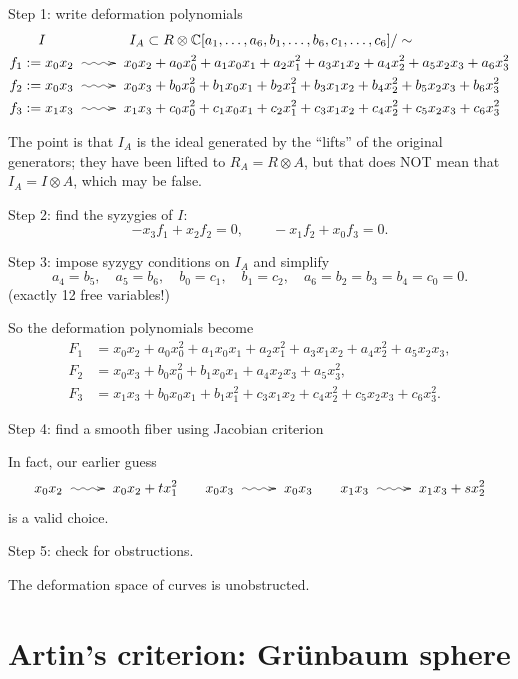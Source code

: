Step 1: write deformation polynomials
$$
\begin{aligned}
I\qquad &\qquad \qquad I_A \subset R \otimes \mathbb{C}[a_1,\ldots, a_6,b_1,\ldots,b_6,c_1,\ldots,c_6]/\sim
\\
\hspace{-0.5em}f_1:=x_0x_2&\xymatrix{\ar@{~>}[r]&}
x_0x_2+a_0x_0^2+a_1x_0x_1+a_2x_1^2+a_3x_1x_2+a_4x_2^2+a_5x_2x_3+a_6x_3^2\\
f_2:=x_0x_3&\xymatrix{\ar@{~>}[r]&}
x_0x_3+b_0x_0^2+b_1x_0x_1+b_2x_1^2+b_3x_1x_2+b_4x_2^2+b_5x_2x_3+b_6x_3^2\\
f_3:=x_1x_3&\xymatrix{\ar@{~>}[r]&}
x_1x_3+c_0x_0^2+c_1x_0x_1+c_2x_1^2+c_3x_1x_2+c_4x_2^2+c_5x_2x_3+c_6x_3^2
\end{aligned}
$$

\noindent
The point is that $I_A$ is the ideal
generated by the ``lifts'' of the
original generators; they have been
lifted to $R_A = R \otimes A$,
but that does NOT mean that
$I_A = I \otimes A$, which may be false.

\noindent
Step 2: find the syzygies of $I$:
$$
-x_3 f_1+x_2f_2=0,\qquad
-x_1f_2+x_0f_3=0.
$$

\medskip\noindent
Step 3: impose syzygy conditions on $I_A$
and simplify
$$
a_4=b_5,\quad  a_5=b_6,
\quad b_0=c_1, \quad  b_1=c_2,
\quad a_6=b_2=b_3=b_4=c_0=0.
$$
(exactly 12 free variables!)

So the deformation polynomials become
$$
\begin{aligned}
F_1&=x_0x_2+a_0x_0^2+a_1x_0x_1+a_2x_1^2+a_3x_1x_2+a_4x_2^2+a_5x_2x_3,\\
F_2&=x_0x_3+b_0x_0^2+b_1x_0x_1+a_4x_2x_3+a_5x_3^2,\\
F_3&=x_1x_3+b_0x_0x_1+b_1x_1^2+c_3x_1x_2+c_4x_2^2+c_5x_2x_3+c_6x_3^2.
\end{aligned}
$$

Step 4: find a smooth fiber using Jacobian criterion

In fact, our earlier guess
$$
x_0x_2\xymatrix{\ar@{~>}[r]&}
x_0x_2+tx_1^2\qquad
x_0x_3\xymatrix{\ar@{~>}[r]&}
x_0x_3\qquad
x_1x_3\xymatrix{\ar@{~>}[r]&}
x_1x_3+sx_2^2
$$
is a valid choice.

\vspace{2em}Step 5: check for obstructions.

The deformation space of curves is unobstructed.

\section{
Artin's criterion: Gr\"unbaum sphere}

